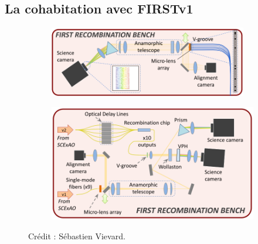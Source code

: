 \subsection{La cohabitation avec FIRSTv1}
\label{sec:V1V2Subaru}

\begin{figure}[ht!]
    \centering
    \begin{subfigure}{\textwidth}
        \centering
        \includegraphics[width=0.95\textwidth]{Figure_Chap5/20230211_FIRST_Recomb_V1_Sheme.png}
    \end{subfigure}
    \begin{subfigure}{\textwidth}
        \centering
        \includegraphics[width=\textwidth]{Figure_Chap5/20220601_SCExAO_FIRSTRecombBench_V1_V2_Scheme.png}
    \end{subfigure}
    \caption[]{Crédit : Sébastien Vievard.}
    \label{fig:FIRSTSubaruScheme}
\end{figure}

